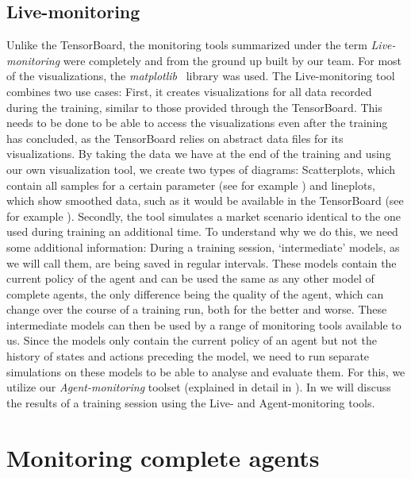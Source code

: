 \subsection{Live-monitoring}\label{subsec:LiveMonitoring}

Unlike the TensorBoard, the monitoring tools summarized under the term \emph{Live-monitoring} were completely and from the ground up built by our team. For most of the visualizations, the \emph{matplotlib}~\cite{Matplotlib} library was used. The Live-monitoring tool combines two use cases: First, it creates visualizations for all data recorded during the training, similar to those provided through the TensorBoard. This needs to be done to be able to access the visualizations even after the training has concluded, as the TensorBoard relies on abstract data files for its visualizations. By taking the data we have at the end of the training and using our own visualization tool, we create two types of diagrams: Scatterplots, which contain all samples for a certain parameter (see for example ) and lineplots, which show smoothed data, such as it would be available in the TensorBoard (see for example ). Secondly, the tool simulates a market scenario identical to the one used during training an additional time. To understand why we do this, we need some additional information: During a training session, `intermediate' models, as we will call them, are being saved in regular intervals. These models contain the current policy of the agent and can be used the same as any other model of complete agents, the only difference being the quality of the agent, which can change over the course of a training run, both for the better and worse. These intermediate models can then be used by a range of monitoring tools available to us. Since the models only contain the current policy of an agent but not the history of states and actions preceding the model, we need to run separate simulations on these models to be able to analyse and evaluate them. For this, we utilize our \emph{Agent-monitoring} toolset (explained in detail in ). In  we will discuss the results of a training session using the Live- and Agent-monitoring tools.

\section{Monitoring complete agents}\label{sec:CompleteAgents}


